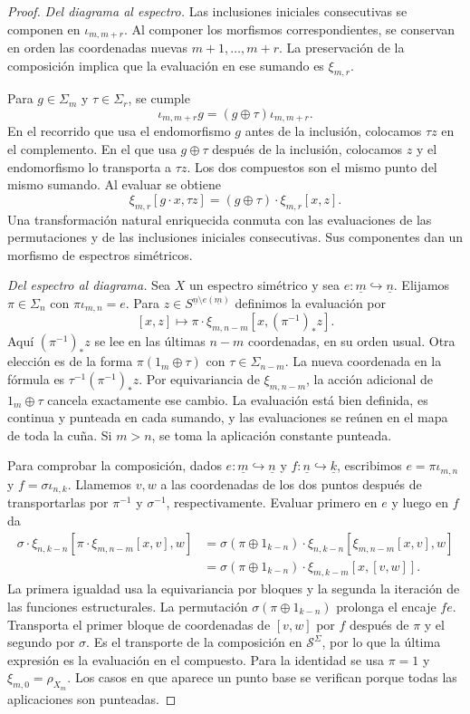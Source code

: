 \begin{proof}
\emph{Del diagrama al espectro.} Las inclusiones iniciales consecutivas se componen en $\iota_{m,m+r}$. Al componer los morfismos correspondientes, se conservan en orden las coordenadas nuevas $m+1,\ldots,m+r$. La preservación de la composición implica que la evaluación en ese sumando es $\xi_{m,r}$.

Para $g\in\Sigma_m$ y $\tau\in\Sigma_r$, se cumple
\[
\iota_{m,m+r}g=(g\oplus\tau)\iota_{m,m+r}.
\]
En el recorrido que usa el endomorfismo $g$ antes de la inclusión, colocamos $\tau z$ en el complemento. En el que usa $g\oplus\tau$ después de la inclusión, colocamos $z$ y el endomorfismo lo transporta a $\tau z$. Los dos compuestos son el mismo punto del mismo sumando. Al evaluar se obtiene
\[
\xi_{m,r}[g\cdot x,\tau z]=(g\oplus\tau)\cdot\xi_{m,r}[x,z].
\]
Una transformación natural enriquecida conmuta con las evaluaciones de las permutaciones y de las inclusiones iniciales consecutivas. Sus componentes dan un morfismo de espectros simétricos.

\emph{Del espectro al diagrama.} Sea $X$ un espectro simétrico y sea $e\colon\underline m\hookrightarrow\underline n$. Elijamos $\pi\in\Sigma_n$ con $\pi\iota_{m,n}=e$. Para $z\in S^{\underline n\setminus e(\underline m)}$ definimos la evaluación por
\[
[x,z]\longmapsto
\pi\cdot\xi_{m,n-m}[x,(\pi^{-1})_*z].
\]
Aquí $(\pi^{-1})_*z$ se lee en las últimas $n-m$ coordenadas, en su orden usual. Otra elección es de la forma $\pi(1_m\oplus\tau)$ con $\tau\in\Sigma_{n-m}$. La nueva coordenada en la fórmula es $\tau^{-1}(\pi^{-1})_*z$. Por equivariancia de $\xi_{m,n-m}$, la acción adicional de $1_m\oplus\tau$ cancela exactamente ese cambio. La evaluación está bien definida, es continua y punteada en cada sumando, y las evaluaciones se reúnen en el mapa de toda la cuña. Si $m>n$, se toma la aplicación constante punteada.

Para comprobar la composición, dados $e\colon\underline m\hookrightarrow\underline n$ y $f\colon\underline n\hookrightarrow\underline k$, escribimos $e=\pi\iota_{m,n}$ y $f=\sigma\iota_{n,k}$. Llamemos $v,w$ a las coordenadas de los dos puntos después de transportarlas por $\pi^{-1}$ y $\sigma^{-1}$, respectivamente. Evaluar primero en $e$ y luego en $f$ da
\[
\begin{aligned}
\sigma\cdot\xi_{n,k-n}[\pi\cdot\xi_{m,n-m}[x,v],w]
&=\sigma(\pi\oplus1_{k-n})\cdot
\xi_{n,k-n}[\xi_{m,n-m}[x,v],w]\\
&=\sigma(\pi\oplus1_{k-n})\cdot\xi_{m,k-m}[x,[v,w]].
\end{aligned}
\]
La primera igualdad usa la equivariancia por bloques y la segunda la iteración de las funciones estructurales. La permutación $\sigma(\pi\oplus1_{k-n})$ prolonga el encaje $fe$. Transporta el primer bloque de coordenadas de $[v,w]$ por $f$ después de $\pi$ y el segundo por $\sigma$. Es el transporte de la composición en $\mathcal S^\Sigma$, por lo que la última expresión es la evaluación en el compuesto. Para la identidad se usa $\pi=1$ y $\xi_{m,0}=\rho_{X_m}$. Los casos en que aparece un punto base se verifican porque todas las aplicaciones son punteadas.


\end{proof}
